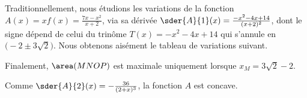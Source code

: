 Traditionnellement, nous étudions les variations de la fonction
$A(x) = x f(x) = \frac{7 x - x^2}{x + 2}$, via sa dérivée
$\sder{A}{1}(x) = \frac{- x^2 - 4 x + 14}{(x + 2)^2}$, dont le signe dépend de celui du trinôme $T(x) = - x^2 - 4 x + 14$ qui s'annule en $\big( - 2 \pm 3 \sqrt{2} \big)$.
Nous obtenons aisément le tableau de variations suivant.
%
\begin{center}
\end{center}


Finalement,
$\area(MNOP)$ est maximale uniquement lorsque $x_M = 3 \sqrt{2} - 2$.


\begin{remark}
    Comme
    $\sder{A}{2}(x) = - \frac{36}{(2 + x)^3}$,
    la fonction $A$ est concave.
\end{remark}
